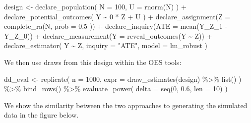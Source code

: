 \documentclass[
  12pt,
]{book}
\newenvironment{Shaded}{\begin{snugshade}}{\end{snugshade}}
\newcommand{\AttributeTok}[1]{\textcolor[rgb]{0.77,0.63,0.00}{#1}}
\newcommand{\DecValTok}[1]{\textcolor[rgb]{0.00,0.00,0.81}{#1}}
\newcommand{\FloatTok}[1]{\textcolor[rgb]{0.00,0.00,0.81}{#1}}
\newcommand{\FunctionTok}[1]{\textcolor[rgb]{0.00,0.00,0.00}{#1}}
\newcommand{\NormalTok}[1]{#1}
\newcommand{\OtherTok}[1]{\textcolor[rgb]{0.56,0.35,0.01}{#1}}
\newcommand{\SpecialCharTok}[1]{\textcolor[rgb]{0.00,0.00,0.00}{#1}}
\newcommand{\StringTok}[1]{\textcolor[rgb]{0.31,0.60,0.02}{#1}}
\theoremstyle{definition}
\theoremstyle{definition}
\theoremstyle{definition}
\theoremstyle{remark}
\begin{document}
\begin{Shaded}
\begin{Highlighting}[]
\NormalTok{design }\OtherTok{\textless{}{-}} \FunctionTok{declare\_population}\NormalTok{(}
  \AttributeTok{N =} \DecValTok{100}\NormalTok{,}
  \AttributeTok{U =} \FunctionTok{rnorm}\NormalTok{(N)}
\NormalTok{) }\SpecialCharTok{+}
  \FunctionTok{declare\_potential\_outcomes}\NormalTok{(}
\NormalTok{    Y }\SpecialCharTok{\textasciitilde{}} \DecValTok{0} \SpecialCharTok{*}\NormalTok{ Z }\SpecialCharTok{+}\NormalTok{ U}
\NormalTok{  ) }\SpecialCharTok{+}
  \FunctionTok{declare\_assignment}\NormalTok{(}\AttributeTok{Z =} \FunctionTok{complete\_ra}\NormalTok{(N,}
    \AttributeTok{prob =} \FloatTok{0.5}
\NormalTok{  )) }\SpecialCharTok{+}
  \FunctionTok{declare\_inquiry}\NormalTok{(}\AttributeTok{ATE =} \FunctionTok{mean}\NormalTok{(Y\_Z\_1 }\SpecialCharTok{{-}}\NormalTok{ Y\_Z\_0)) }\SpecialCharTok{+}
  \FunctionTok{declare\_measurement}\NormalTok{(}\AttributeTok{Y =} \FunctionTok{reveal\_outcomes}\NormalTok{(Y }\SpecialCharTok{\textasciitilde{}}\NormalTok{ Z)) }\SpecialCharTok{+}
  \FunctionTok{declare\_estimator}\NormalTok{(}
\NormalTok{    Y }\SpecialCharTok{\textasciitilde{}}\NormalTok{ Z,}
    \AttributeTok{inquiry =} \StringTok{"ATE"}\NormalTok{,}
    \AttributeTok{model =}\NormalTok{ lm\_robust}
\NormalTok{  )}
\end{Highlighting}
\end{Shaded}

We then use draws from this design within the OES tools:

\begin{Shaded}
\begin{Highlighting}[]
\NormalTok{dd\_eval }\OtherTok{\textless{}{-}} \FunctionTok{replicate}\NormalTok{(}
  \AttributeTok{n =} \DecValTok{1000}\NormalTok{,}
  \AttributeTok{expr =} \FunctionTok{draw\_estimates}\NormalTok{(design) }\SpecialCharTok{\%\textgreater{}\%}
    \FunctionTok{list}\NormalTok{()}
\NormalTok{) }\SpecialCharTok{\%\textgreater{}\%}
  \FunctionTok{bind\_rows}\NormalTok{() }\SpecialCharTok{\%\textgreater{}\%}
  \FunctionTok{evaluate\_power}\NormalTok{(}
    \AttributeTok{delta =} \FunctionTok{seq}\NormalTok{(}\DecValTok{0}\NormalTok{, }\FloatTok{0.6}\NormalTok{, }\AttributeTok{len =} \DecValTok{10}\NormalTok{)}
\NormalTok{  )}
\end{Highlighting}
\end{Shaded}

We show the similarity between the two approaches to generating the
simulated data in the figure below.
\end{document}
